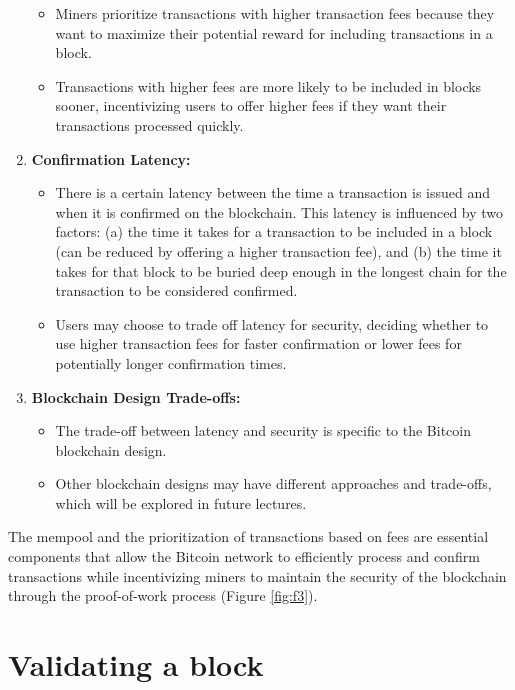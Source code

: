 \documentclass{report}
\begin{document}
\begin{enumerate}
\begin{itemize}
		\item Miners prioritize transactions with higher transaction fees because they want to maximize their potential reward for including transactions in a block.
		\item Transactions with higher fees are more likely to be included in blocks sooner, incentivizing users to offer higher fees if they want their transactions processed quickly.
	\end{itemize}
	\item \textbf{Confirmation Latency:}
	\begin{itemize}
		\item There is a certain latency between the time a transaction is issued and when it is confirmed on the blockchain. This latency is influenced by two factors: (a) the time it takes for a transaction to be included in a block (can be reduced by offering a higher transaction fee), and (b) the time it takes for that block to be buried deep enough in the longest chain for the transaction to be considered confirmed.
		\item Users may choose to trade off latency for security, deciding whether to use higher transaction fees for faster confirmation or lower fees for potentially longer confirmation times.
	\end{itemize}
	\item \textbf{Blockchain Design Trade-offs:}
	\begin{itemize}
		\item The trade-off between latency and security is specific to the Bitcoin blockchain design.
		\item Other blockchain designs may have different approaches and trade-offs, which will be explored in future lectures.
	\end{itemize}
\end{enumerate}
The mempool and the prioritization of transactions based on fees are essential components that allow the Bitcoin network to efficiently process and confirm transactions while incentivizing miners to maintain the security of the blockchain through the proof-of-work process (Figure \ref{fig:f3}).

\section{Validating a block}
\end{document}
